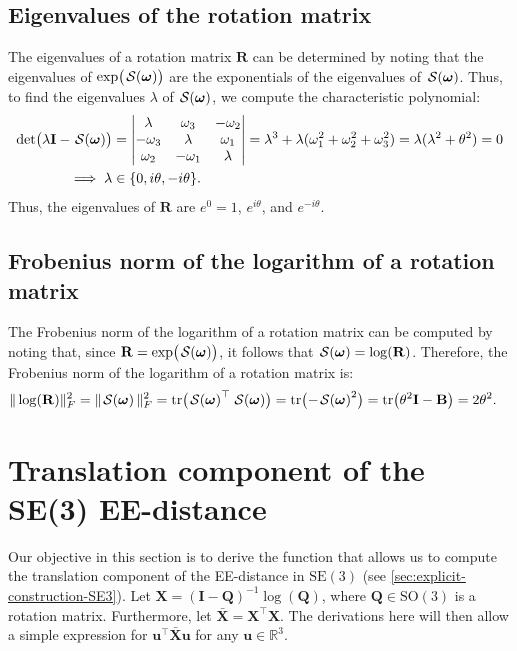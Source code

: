 \subsection{Eigenvalues of the rotation matrix}
The eigenvalues of a rotation matrix $\mathbf{R}$ can be determined by noting that the eigenvalues of $\exp\bigl(\SL[\boldsymbol{\omega}]\bigr)$ are the exponentials of the eigenvalues of $\SL[\boldsymbol{\omega}]$. Thus, to find the eigenvalues $\lambda$ of $\SL[\boldsymbol{\omega}]$, we compute the characteristic polynomial:
\begin{align}
    \det\bigl(\lambda\mathbf{I} - \SL[\boldsymbol{\omega}]\bigr)&=\begin{vmatrix}
        \lambda & \omega_3 & -\omega_2\\
        -\omega_3 & \lambda & \omega_1\\
        \omega_2 & -\omega_1 & \lambda
    \end{vmatrix} = \lambda^3 + \lambda(\omega_1^2 + \omega_2^2 + \omega_3^2) = \lambda(\lambda^2 + \theta^2)=0\\
    \implies \lambda&\in\{0, i\theta, -i\theta\}.
\end{align}
Thus, the eigenvalues of $\mathbf{R}$ are $e^0=1$, $e^{i\theta}$, and $e^{-i\theta}$.

\subsection{Frobenius norm of the logarithm of a rotation matrix}
The Frobenius norm of the logarithm of a rotation matrix can be computed by noting that, since $\mathbf{R} = \exp\bigl(\SL[\boldsymbol{\omega}]\bigr)$, it follows that $\SL[\boldsymbol{\omega}] = \log(\mathbf{R})$. Therefore, the Frobenius norm of the logarithm of a rotation matrix is:
\begin{align}
    \|\log(\mathbf{R})\|_F^2=\|\SL[\boldsymbol{\omega}]\|_F^2 &= \tr\bigl(\SL[\boldsymbol{\omega}]^\top\SL[\boldsymbol{\omega}]\bigr) = \tr\bigl(-\SL[\boldsymbol{\omega}]^2\bigr) = \tr\bigl(\theta^2\mathbf{I} - \mathbf{B}\bigr) = 2\theta^2.
\end{align}

\section{Translation component of the SE(3) EE-distance}\label{app:translation-component-SE3}
Our objective in this section is to derive the function that allows us to compute the translation component of the EE-distance in $\text{SE}(3)$ (see \cref{sec:explicit-construction-SE3}). Let $\mathbf{X}=(\mathbf{I} - \mathbf{Q})^{-1}\log(\mathbf{Q})$, where $\mathbf{Q}\in\text{SO}(3)$ is a rotation matrix. Furthermore, let $\bar{\mathbf{X}}=\mathbf{X}^\top\mathbf{X}$. The derivations here will then allow a simple expression for $\mathbf{u}^\top\bar{\mathbf{X}}\mathbf{u}$ for any $\mathbf{u}\in\mathbb{R}^3$.


